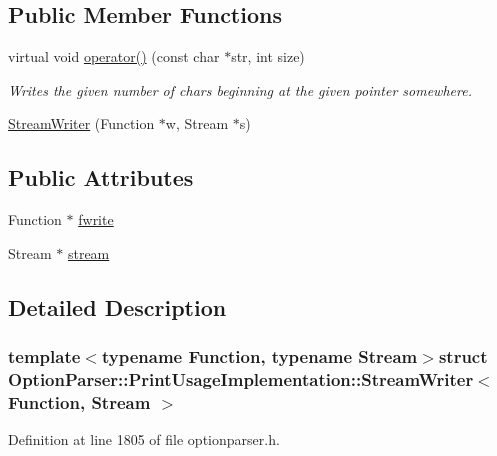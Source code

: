\subsection*{Public Member Functions}
\begin{DoxyCompactItemize}
\item 
virtual void \hyperlink{struct_option_parser_1_1_print_usage_implementation_1_1_stream_writer_a12857c259c5cd4367aae57e6ebb26341}{operator()} (const char $\ast$str, int size)
\begin{DoxyCompactList}\small\item\em Writes the given number of chars beginning at the given pointer somewhere. \end{DoxyCompactList}\item 
\hyperlink{struct_option_parser_1_1_print_usage_implementation_1_1_stream_writer_a57540078d18d615f52a8f9f3787472cf}{Stream\-Writer} (Function $\ast$w, Stream $\ast$s)
\end{DoxyCompactItemize}
\subsection*{Public Attributes}
\begin{DoxyCompactItemize}
\item 
Function $\ast$ \hyperlink{struct_option_parser_1_1_print_usage_implementation_1_1_stream_writer_a6627a94257a890ec2786d542207dcf81}{fwrite}
\item 
Stream $\ast$ \hyperlink{struct_option_parser_1_1_print_usage_implementation_1_1_stream_writer_aa5271816c5a983d1094d95f4efb24bc6}{stream}
\end{DoxyCompactItemize}


\subsection{Detailed Description}
\subsubsection*{template$<$typename Function, typename Stream$>$struct Option\-Parser\-::\-Print\-Usage\-Implementation\-::\-Stream\-Writer$<$ Function, Stream $>$}



Definition at line 1805 of file optionparser.\-h.



